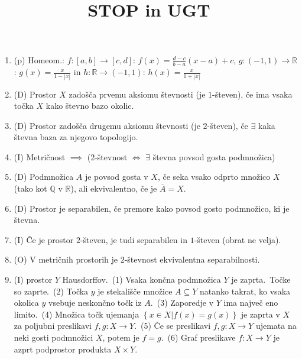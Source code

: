 \documentclass[10pt,a4paper]{article}
\title{STOP in UGT}
\author{}
\date{}
\begin{document}

\begin{enumerate} 
    \setlength\itemsep{-1px}%

\item (p) Homeom.: $f: [a,b]\to[c,d]$: $f(x)=\frac{d-c}{b-a}(x-a)+c$,
$g: (-1,1)\to\mathbb{R}$: $g(x)=\frac{x}{1-|x|}$ in 
$h: \mathbb{R}\to(-1,1)$: $h(x)=\frac{x}{1+|x|}$
            
\item (D) Prostor $X$ zadošča prvemu aksiomu števnosti (je $1$-števen), če ima vsaka točka $X$ kako števno bazo okolic.
            
\item (D) Prostor zadošča drugemu aksiomu števnosti (je $2$-števen), če $\exists$ kaka števna baza za njegovo topologijo.
            
\item (I) Metričnost $\implies$ (2-števnost $\iff$ $\exists$ števna povsod gosta podmnožica)
            
\item (D) Podmnožica $A$ je povsod gosta v $X$, če seka vsako odprto množico $X$ (tako kot $\mathbb{Q}$ v $\mathbb{R}$), ali ekvivalentno, če je $\overline{A}=X$.
            
\item (D) Prostor je separabilen, če premore kako povsod gosto podmnožico, ki je števna.
            
\item (I) Če je prostor $2$-števen, je tudi separabilen in $1$-števen (obrat ne velja).
            
\item (O) V metričnih prostorih je $2$-števnost ekvivalentna separabilnosti.
            
\item (I)  prostor $Y$ Hausdorffov.~(1) Vsaka končna podmnožica $Y$ je zaprta.~Točke so zaprte.~(2) Točka $y$ je stekališče množice $A\subseteq Y$ natanko takrat, ko vsaka okolica $y$ vsebuje neskončno točk iz $A$.~(3) Zaporedje v $Y$ ima največ eno limito.~(4) Množica točk ujemanja $\left\{x\in X | f(x)=g(x)\right\}$ je zaprta v $X$ za poljubni preslikavi $f,g: X\to Y$.~(5) Če se preslikavi $f,g: X\to Y$ ujemata na neki gosti podmnožici $X$, potem je $f=g$.~(6) Graf preslikave $f: X\to Y$ je azprt podprostor produkta $X\times Y$.
            

\end{enumerate}
\end{document}
